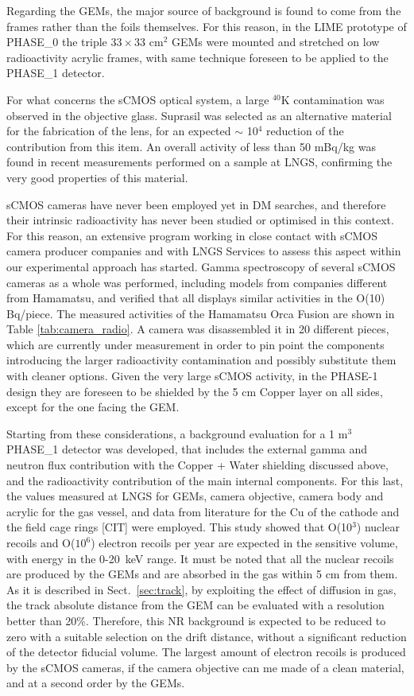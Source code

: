\documentclass[physics,article,submit,moreauthors,pdftex]{Definitions/mdpi}
\begin{document}
Regarding the GEMs, the major source of background is found to come from the frames rather than the foils themselves. For this reason, in the LIME prototype of PHASE\_0 the triple $33 \times 33$ cm$^2$ GEMs were mounted and stretched on low radioactivity acrylic frames, with same technique foreseen to be applied to the PHASE\_1 detector. 

For what concerns the sCMOS optical system, a large $^{40}$K contamination was observed in the objective glass. Suprasil was selected as an alternative material for the fabrication of the lens, for an expected $\sim$ 10$^4$ reduction of the contribution from this item. An overall activity of less than 50 mBq/kg was found in recent measurements performed on a sample at LNGS, confirming the very good properties of this material.

sCMOS cameras have never been employed yet in DM searches, and therefore their intrinsic radioactivity has never been studied or optimised in this context. For this reason, an extensive program working in close contact with sCMOS camera producer companies and with LNGS Services to assess this aspect within our experimental approach has started. Gamma spectroscopy of several sCMOS cameras as a whole was performed, including models from companies different from Hamamatsu, and verified that all displays similar activities in the O(10) Bq/piece. The measured activities of the Hamamatsu Orca Fusion are shown in Table \ref{tab:camera_radio}. A camera was disassembled it in 20 different pieces, which are currently under measurement in order to pin point the components introducing the larger radioactivity contamination and possibly substitute them with cleaner options. Given the very large sCMOS activity, in the PHASE-1 design they are foreseen to be shielded by the 5 cm Copper layer on all sides, except for the one facing the GEM.

Starting from these considerations, a background evaluation for a 1 m$^3$ PHASE\_1 detector was developed, that includes the external gamma and neutron flux contribution with the Copper + Water shielding discussed above, and the radioactivity contribution of the main internal components. For this last,  the values measured at LNGS for GEMs, camera objective, camera body and acrylic for the gas vessel, and data from literature for the Cu of the cathode and the field cage rings [CIT]  were employed. This study showed that O(10$^3$) nuclear recoils and O($10^6$) electron recoils per year are expected in the sensitive volume, with energy in the 0-20~keV range. It must be noted that all the nuclear recoils are produced by the GEMs and are absorbed in the gas within 5 cm from them. As it is described in Sect.~\ref{sec:track}, by exploiting the effect of diffusion in gas, the track absolute distance from the GEM can be evaluated with a resolution better than 20\%. Therefore, this NR background is expected to be reduced to zero with a suitable selection on the drift distance, without a significant reduction of the detector fiducial volume. The largest amount of electron recoils is produced by the sCMOS cameras, if the camera objective can me made of a clean material, and at a second order by the GEMs.
\end{document}

